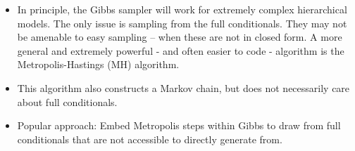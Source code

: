 %  
% 
% 
% 
% 

\begin{frame}

\begin{itemize}\setlength{\itemsep}{0.5cm}
\item In principle, the Gibbs sampler will work for extremely
complex hierarchical models. The only issue is sampling from the
full conditionals. They may not be amenable to easy sampling --
when these are not in closed form. A more general and extremely
powerful - and often easier to code - algorithm is the
Metropolis-Hastings (MH) algorithm.

\item This algorithm also constructs a Markov chain, but does not necessarily care about full conditionals.

\item Popular approach: Embed Metropolis steps within Gibbs to draw from full conditionals that are not accessible to directly generate from. 
\end{itemize}

\end{frame}

